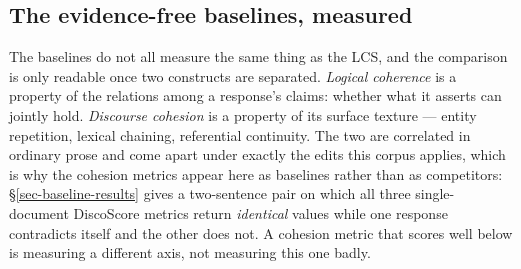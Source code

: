 \subsection{The evidence-free baselines, measured}
\label{sec-baselines-measured}

The baselines do not all measure the same thing as the LCS, and the comparison is only readable
once two constructs are separated. \emph{Logical coherence} is a property of the relations among a
response's claims: whether what it asserts can jointly hold. \emph{Discourse cohesion} is a property
of its surface texture --- entity repetition, lexical chaining, referential continuity. The two are
correlated in ordinary prose and come apart under exactly the edits this corpus applies, which is
why the cohesion metrics appear here as baselines rather than as competitors:
\S\ref{sec-baseline-results} gives a two-sentence pair on which all three single-document
DiscoScore metrics return \emph{identical} values while one response contradicts itself and the
other does not. A cohesion metric that scores well below is measuring a different axis, not
measuring this one badly.

